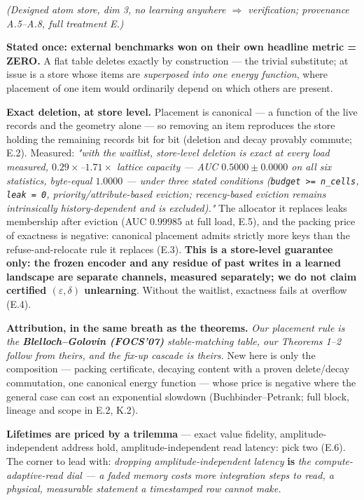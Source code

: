 \documentclass{article}
\begin{document}
\emph{(Designed atom store, dim 3, no learning anywhere $\Rightarrow$ verification; provenance A.5--A.8, full treatment E.)}

\textbf{Stated once: external benchmarks won on their own headline metric = ZERO.} A flat table deletes exactly by construction --- the trivial substitute; at issue is a store whose items are \emph{superposed into one energy function}, where placement of one item would ordinarily depend on which others are present.

\textbf{Exact deletion, at store level.} Placement is canonical --- a function of the live records and the geometry alone --- so removing an item reproduces the store holding the remaining records bit for bit (deletion and decay provably commute; E.2). Measured: \emph{"with the waitlist, store-level deletion is exact at every load measured, $0.29\times$--$1.71\times$ lattice capacity --- AUC $0.5000\pm0.0000$ on all six statistics, byte-equal $1.0000$ --- under three stated conditions (\texttt{budget >= n\_cells}, \texttt{leak = 0}, priority/attribute-based eviction; recency-based eviction remains intrinsically history-dependent and is excluded)."} The allocator it replaces leaks membership after eviction (AUC $0.99985$ at full load, E.5), and the packing price of exactness is negative: canonical placement admits strictly more keys than the refuse-and-relocate rule it replaces (E.3). \textbf{This is a store-level guarantee only: the frozen encoder and any residue of past writes in a learned landscape are separate channels, measured separately; we do not claim certified $(\varepsilon,\delta)$ unlearning}. Without the waitlist, exactness fails at overflow (E.4).

\textbf{Attribution, in the same breath as the theorems.} \emph{Our placement rule is the \textbf{Blelloch--Golovin (FOCS'07)} stable-matching table, our Theorems 1--2 follow from theirs, and the fix-up cascade is theirs.} New here is only the composition --- packing certificate, decaying content with a proven delete/decay commutation, one canonical energy function --- whose price is negative where the general case can cost an exponential slowdown (Buchbinder--Petrank; full block, lineage and scope in E.2, K.2).

\textbf{Lifetimes are priced by a trilemma} --- exact value fidelity, amplitude-independent address hold, amplitude-independent read latency: pick two (E.6). The corner to lead with: \emph{dropping amplitude-independent latency} \textbf{is} \emph{the compute-adaptive-read dial --- a faded memory costs more integration steps to read, a physical, measurable statement a timestamped row cannot make.}
\end{document}
